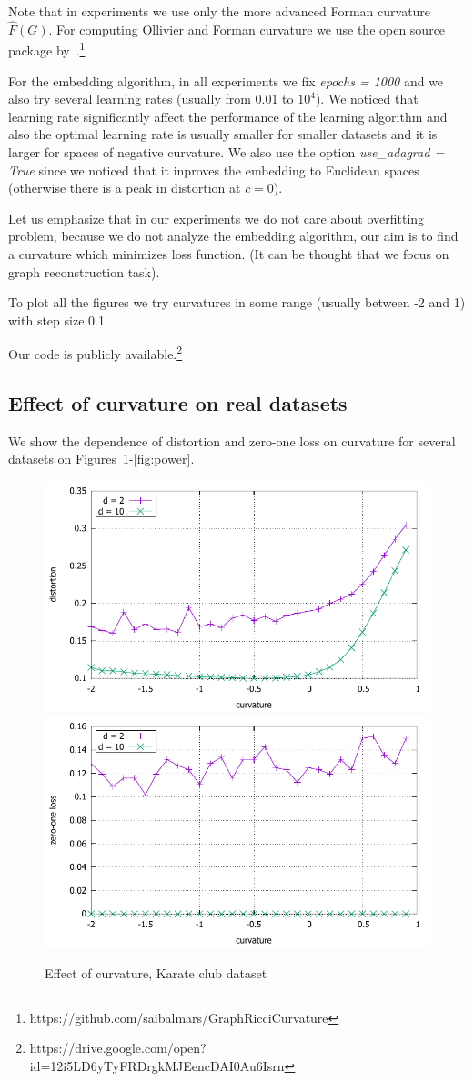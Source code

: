 \documentclass{article} %
\begin{document}
Note that in experiments we use only the more advanced Forman curvature $\hat{F}(G)$.
For computing Ollivier and Forman curvature we use the open source package by~\citet{ni2015ricci}.\footnote{https://github.com/saibalmars/GraphRicciCurvature}

For the embedding algorithm, in all experiments we fix \textit{epochs = 1000} and we also try several learning rates (usually from 0.01 to $10^4$). We noticed that learning rate significantly affect the performance of the learning algorithm and also the optimal learning rate is usually smaller for smaller datasets and it is larger for spaces of negative curvature. We also use the option \textit{use\_adagrad = True} since we noticed that it inproves the embedding to Euclidean spaces (otherwise there is a peak in distortion at $c = 0$).

Let us emphasize that in our experiments we do not care about overfitting problem, because we do not analyze the embedding algorithm, our aim is to find a curvature which minimizes loss function. (It can be thought that we focus on graph reconstruction task).

To plot all the figures we try curvatures in some range (usually between -2 and 1) with step size 0.1.

Our code is publicly available.\footnote{https://drive.google.com/open?id=12i5LD6yTyFRDrgkMJEencDAI0Au6Isrn}

\subsection{Effect of curvature on real datasets}\label{sec:figures}

We show the dependence of distortion and zero-one loss on curvature for several datasets on Figures~\ref{fig:karate}-\ref{fig:power}.


\begin{figure}
    \centering
    \includegraphics[width = 0.49 \textwidth]{karate_distortion.pdf}
    \includegraphics[width = 0.49 \textwidth]{karate_zero_one.pdf}
    \caption{Effect of curvature, Karate club dataset}
    \label{fig:karate}
\end{figure}
\end{document}
